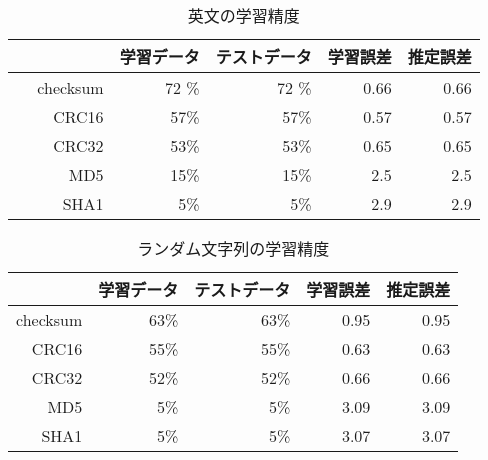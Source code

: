 \documentclass{jarticle}
\begin{document}
\begin{table}[htp]
   \begin{center}
    \caption{英文の学習精度}
    \begin{tabular}{|r|r|r|r|r|}
    \hline
       & 学習データ & テストデータ & 学習誤差 & 推定誤差    \\ \hline　
    checksum   & 72 \% & 72 \% & 0.66  & 0.66    \\ \hline
    CRC16   & 57\% & 57\% & 0.57 & 0.57   \\ \hline
    CRC32   & 53\% & 53\% & 0.65 & 0.65  \\ \hline
    MD5  & 15\% & 15\% & 2.5  & 2.5    \\ \hline
    SHA1    & 5\% & 5\% & 2.9  & 2.9    \\ \hline
    \end{tabular}
   \end{center}

\end{table}

\begin{table}[htp]
   \begin{center}
    \caption{ランダム文字列の学習精度}
    \begin{tabular}{|r|r|r|r|r|}
    \hline
       & 学習データ & テストデータ & 学習誤差 & 推定誤差    \\ \hline
    checksum   & 63\% & 63\% & 0.95 & 0.95   \\ \hline
    CRC16   & 55\% & 55\% & 0.63 & 0.63   \\ \hline
    CRC32   & 52\% & 52\% & 0.66 & 0.66   \\ \hline
    MD5  & 5\% & 5\% & 3.09  & 3.09    \\ \hline
    SHA1    & 5\% & 5\% & 3.07  & 3.07    \\ \hline
    \end{tabular}
   \end{center}

\end{table}
\end{document}
